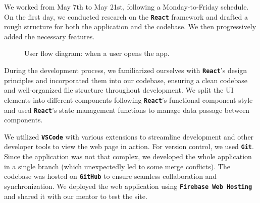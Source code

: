 \documentclass[12pt, a4paper]{article}
\newcommand{\ttbold}[1]{\textbf{\texttt{#1}}}
\begin{document}
\vspace*{.5cm}
\begin{figure}[H]
	{%
		\setlength{\fboxsep}{0pt}%
		\setlength{\fboxrule}{.5pt}%
	}%
	\hfill
	{%
		\setlength{\fboxsep}{0pt}%
		\setlength{\fboxrule}{.5pt}%
	}%
\end{figure}

\pagebreak

We worked from May 7th to May 21st, following a Monday-to-Friday schedule. On the first day, we conducted research on the \ttbold{React} framework and drafted a rough structure for both the application and the codebase. We then progressively added the necessary features.
\begin{figure}[H]
	\centering
	
	\caption{User flow diagram: when a user opens the app.}
\end{figure}

During the development process, we familiarized ourselves with \ttbold{React}'s design principles and incorporated them into our codebase, ensuring a clean codebase and well-organized file structure throughout development. We split the UI elements into different components following \ttbold{React}'s functional component style and used \ttbold{React}'s state management functions to manage data passage between components.

We utilized \ttbold{VSCode} with various extensions to streamline development and other developer tools to view the web page in action. For version control, we used \ttbold{Git}. Since the application was not that complex, we developed the whole application in a single branch (which unexpectedly led to some merge conflicts). The codebase was hosted on \ttbold{GitHub} to ensure seamless collaboration and synchronization. We deployed the web application using \ttbold{Firebase Web Hosting} and shared it with our mentor to test the site.
\end{document}
